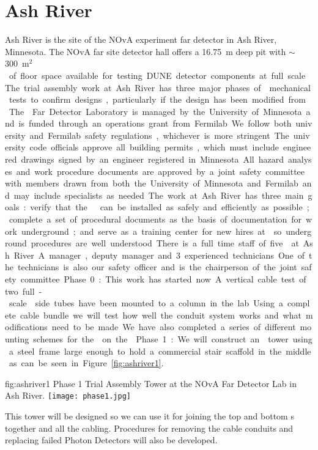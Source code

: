 \section{Ash River}

Ash River is the site of the NOvA experiment far detector in Ash
River, Minnesota. The NOvA far site detector hall offers a \SI{16.75}{m}
deep pit with $\sim$\SI{300}{m$^2$} of floor space available for testing DUNE
detector components at full scale.  The trial assembly work at Ash
River has three major phases of  mechanical tests to
confirm designs, particularly if the design has been modified from
.  The  Far Detector Laboratory is
managed by the University of Minnesota and is funded through an
operations grant from Fermilab.  We follow both university and
Fermilab safety regulations, whichever is more stringent.  The
university code officials approve all building permits, which must
include engineered drawings signed by an engineer registered in
Minnesota. All hazard analyses and work procedure documents are
approved by a joint safety committee with members drawn from both the
University of Minnesota and Fermilab and may include specialists as
needed.

The work at Ash River has three main goals: verify that the
  can be installed as safely and efficiently as
possible; complete a set of procedural documents as the basis of
documentation for work underground; and serve as a training center for
new hires at \surf so underground procedures are well understood.

There is a full time staff of five  at Ash River. A manager,
deputy manager and 3 experienced technicians.  One of the technicians
is also our safety officer and is the chairperson of the joint safety
committee.


Phase 0: This work has started now.  A vertical cable test of two
full-scale  side tubes have been mounted to a column in the
lab. Using a complete cable bundle we will test how well the conduit
system works and what modifications need to be made. We have also
completed a series of different mounting schemes for the 
on the .

Phase 1: We will construct an  tower using a steel frame large
enough to hold a commercial stair scaffold in the middle as can be
seen in Figure ~\ref{fig:ashriver1}.
\begin{dunefigure}{fig:ashriver1}
  {Phase 1 Trial Assembly  Tower at the NOvA Far Detector Lab in Ash River.}
  \texttt{[image: phase1.jpg]}
\end{dunefigure}
This  tower will be designed so we can
use it for joining the top and bottom s together and all the
cabling. Procedures for removing the cable conduits and replacing
failed Photon Detectors will also be developed.


